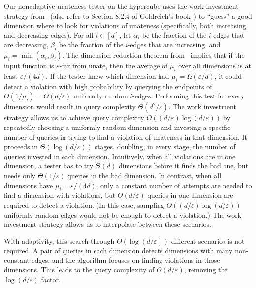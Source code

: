\documentclass[11pt]{article}
\numberwithin{equation}{section}
\theoremstyle{definition}
\theoremstyle{plain}
\newcommand{\eps}{\varepsilon}
\begin{document}
Our nonadaptive unateness tester on the hypercube uses the work investment strategy from~\cite{BerRY14} (also refer to Section 8.2.4 of Goldreich's book~\cite{Go-book}) to ``guess'' a good dimension where to look for violations of unateness (specifically, both increasing and decreasing edges).  For all $i\in[d]$, let $\alpha_i$ be the fraction of the $i$-edges that are decreasing, $\beta_i$ be the fraction of the $i$-edges that are increasing, and $\mu_i = \min(\alpha_i,\beta_i)$. The dimension reduction theorem from~\cite{CDJS17} implies that if the input function is $\eps$-far from unate, then the average of $\mu_i$ over all dimensions is at least $\eps/({4d})$. If the tester knew which dimension had $\mu_i=\Omega(\eps/d)$, it could detect a violation with high probability by querying the endpoints of $O(1/\mu_i)=O(d/\eps)$ uniformly random $i$-edges.
Performing this test for every dimension would result in query complexity $\Theta(d^2/\eps)$. The work investment strategy allows us to achieve query complexity $O((d/\eps) \log (d/\eps))$ by repeatedly choosing a uniformly random dimension and investing a specific number of queries in trying to find a violation of unateness in that dimension. It proceeds in $\Theta(\log (d/\eps))$ stages, doubling, in every stage, the number of queries invested in each dimension. Intuitively, when all violations are in one dimension, a tester has to try $\Theta(d)$ dimensions before it finds the bad one, but needs only $\Theta(1/\eps)$ queries in the bad dimension. In contrast, when all dimensions have $\mu_i=\eps/(4d)$, only a constant number of attempts are needed to find a dimension with violations, but $\Theta(d/\eps)$ queries in one dimension are required to detect a violation. (In this case, sampling $\Theta((d/\eps) \log (d/\eps))$ uniformly random edges would not be enough to detect a violation.) The work investment strategy allows us to interpolate between these scenarios.

%
%
%
%

With adaptivity, this search  through $\Theta(\log (d/\eps))$ different scenarios is not required.
A pair of queries in each dimension detects dimensions with many non-constant edges, and the algorithm focuses
on finding violations in those dimensions. This leads to the query complexity of $O(d/\eps)$, removing the $\log (d/\eps)$ factor.
\end{document}
